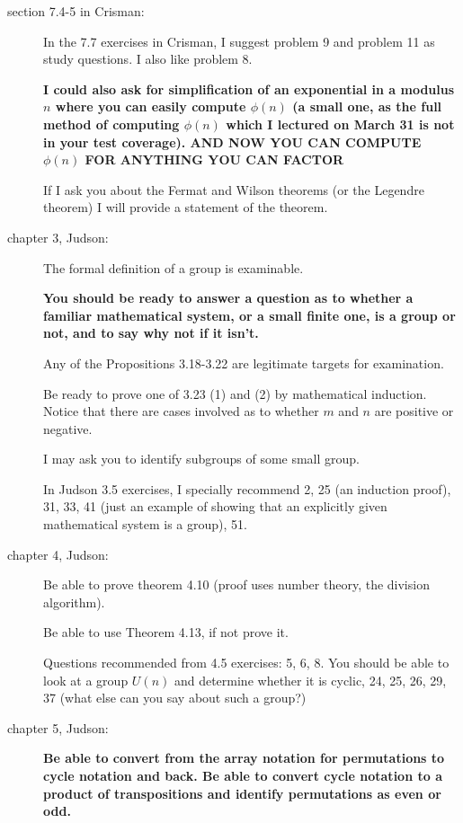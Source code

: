 \documentclass[12pt]{article}
\begin{document}
\begin{description}

\item[section 7.4-5 in Crisman:]  In the 7.7 exercises in Crisman, I suggest problem 9 and problem 11 as study questions.  I also like problem 8.

{\bf I could also ask for simplification of an exponential in a modulus $n$ where you can easily compute $\phi(n)$ (a small one, as the full method of computing $\phi(n)$ which I lectured on March 31 is not in your test coverage).  AND NOW YOU CAN COMPUTE $\phi(n)$ FOR ANYTHING YOU CAN FACTOR}

If I ask you about the Fermat and Wilson theorems (or the Legendre theorem) I will provide a statement of the theorem.

\item[chapter 3, Judson:]  

The formal definition of a group is examinable.

{\bf You should be ready to answer a question as to whether a familiar mathematical system, or a small finite one, is a group or not, and to say why not if it isn't.}

Any of the Propositions 3.18-3.22 are legitimate targets for examination.

Be ready to prove one of 3.23 (1) and (2) by mathematical induction.  Notice that there are cases involved
as to whether $m$ and $n$ are positive or negative.  

I may ask you to identify subgroups of some small group.

In Judson 3.5 exercises, I specially recommend 2, 25 (an induction proof), 31, 33, 41 (just an example of showing that an explicitly given mathematical system is a group), 51.

\item[chapter 4, Judson:]

Be able to prove theorem 4.10 (proof uses number theory, the division algorithm).

Be able to use Theorem 4.13, if not prove it.

Questions recommended from 4.5 exercises:  5, 6, 8.  You should be able to look at a group $U(n)$ and determine whether it is cyclic, 24, 25, 26, 29, 37 (what else can you say about such a group?)

\item[chapter 5, Judson:]

{\bf Be able to convert from the array notation for permutations to cycle notation and back.  Be able to convert cycle notation to a product of transpositions and identify permutations as even or odd.

}
\end{description}
\end{document}

